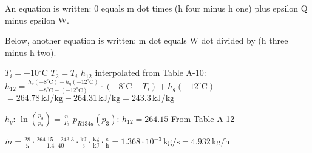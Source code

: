 An equation is written:  
0 equals m dot times (h four minus h one) plus epsilon Q minus epsilon W.  

Below, another equation is written:  
m dot equals W dot divided by (h three minus h two).

\( T_i = -10^\circ \text{C} \)  
\( T_2 = T_i \)  
\( h_{12} \) interpolated from Table A-10:  
\( h_{12} = \frac{h_g(-8^\circ \text{C}) - h_g(-12^\circ \text{C})}{-8^\circ \text{C} - (-12^\circ \text{C})} \cdot (-8^\circ \text{C} - T_i) + h_g(-12^\circ \text{C}) \)  
\( = 264.78 \, \text{kJ/kg} - 264.31 \, \text{kJ/kg} = 243.3 \, \text{kJ/kg} \)  

\( h_g \):  
\( \ln \left( \frac{p_3}{p_2} \right) = \frac{n}{T_2} \)  
\( p_{R134a}(p_3) \): \( h_{12} = 264.15 \)  
From Table A-12  

\( \dot{m} = \frac{28}{5} \cdot \frac{264.15 - 243.3}{1.4 \cdot 40} \cdot \frac{\text{kJ}}{\text{s}} \cdot \frac{\text{kg}}{\text{kJ}} \cdot \frac{\text{s}}{\text{h}} = 1.368 \cdot 10^{-3} \, \text{kg/s} = 4.932 \, \text{kg/h} \)